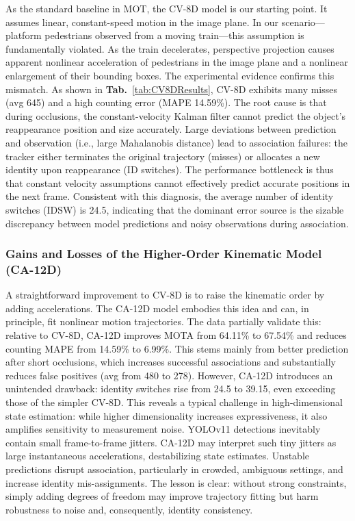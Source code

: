 As the standard baseline in MOT, the CV-8D model is our starting point. It assumes linear, constant-speed motion in the image plane. In our scenario—platform pedestrians observed from a moving train—this assumption is fundamentally violated. As the train decelerates, perspective projection causes apparent nonlinear acceleration of pedestrians in the image plane and a nonlinear enlargement of their bounding boxes.
The experimental evidence confirms this mismatch. As shown in \textbf{Tab.}~\ref{tab:CV8DResults}, CV-8D exhibits many misses (avg 645) and a high counting error (MAPE 14.59\%). The root cause is that during occlusions, the constant-velocity Kalman filter cannot predict the object’s reappearance position and size accurately. Large deviations between prediction and observation (i.e., large Mahalanobis distance) lead to association failures: the tracker either terminates the original trajectory (misses) or allocates a new identity upon reappearance (ID switches). The performance bottleneck is thus that constant velocity assumptions cannot effectively predict accurate positions in the next frame. Consistent with this diagnosis, the average number of identity switches (IDSW) is 24.5, indicating that the dominant error source is the sizable discrepancy between model predictions and noisy observations during association.

\subsubsection{Gains and Losses of the Higher-Order Kinematic Model (CA-12D)}

A straightforward improvement to CV-8D is to raise the kinematic order by adding accelerations. The CA-12D model embodies this idea and can, in principle, fit nonlinear motion trajectories.
The data partially validate this: relative to CV-8D, CA-12D improves MOTA from 64.11\% to 67.54\% and reduces counting MAPE from 14.59\% to 6.99\%. This stems mainly from better prediction after short occlusions, which increases successful associations and substantially reduces false positives (avg from 480 to 278).
However, CA-12D introduces an unintended drawback: identity switches rise from 24.5 to 39.15, even exceeding those of the simpler CV-8D. This reveals a typical challenge in high-dimensional state estimation: while higher dimensionality increases expressiveness, it also amplifies sensitivity to measurement noise. YOLOv11 detections inevitably contain small frame-to-frame jitters. CA-12D may interpret such tiny jitters as large instantaneous accelerations, destabilizing state estimates. Unstable predictions disrupt association, particularly in crowded, ambiguous settings, and increase identity mis-assignments. The lesson is clear: without strong constraints, simply adding degrees of freedom may improve trajectory fitting but harm robustness to noise and, consequently, identity consistency.

